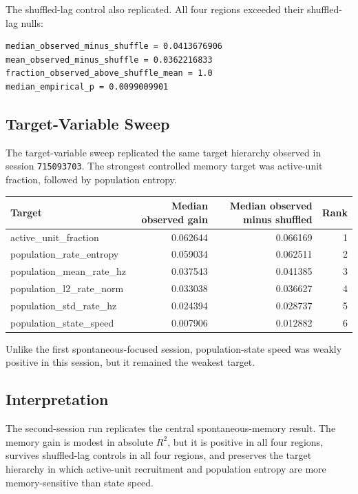 The shuffled-lag control also replicated. All four regions exceeded their shuffled-lag nulls:

\begin{verbatim}
median_observed_minus_shuffle = 0.0413676906
mean_observed_minus_shuffle = 0.0362216833
fraction_observed_above_shuffle_mean = 1.0
median_empirical_p = 0.0099009901
\end{verbatim}

\subsection{Target-Variable Sweep}

The target-variable sweep replicated the same target hierarchy observed in session \texttt{715093703}. The strongest controlled memory target was active-unit fraction, followed by population entropy.

\begin{center}
\begin{tabular}{lrrr}
\hline
Target & Median observed gain & Median observed minus shuffled & Rank \\
\hline
active\_unit\_fraction & 0.062644 & 0.066169 & 1 \\
population\_rate\_entropy & 0.059034 & 0.062511 & 2 \\
population\_mean\_rate\_hz & 0.037543 & 0.041385 & 3 \\
population\_l2\_rate\_norm & 0.033038 & 0.036627 & 4 \\
population\_std\_rate\_hz & 0.024394 & 0.028737 & 5 \\
population\_state\_speed & 0.007906 & 0.012882 & 6 \\
\hline
\end{tabular}
\end{center}

Unlike the first spontaneous-focused session, population-state speed was weakly positive in this session, but it remained the weakest target.

\subsection{Interpretation}

The second-session run replicates the central spontaneous-memory result. The memory gain is modest in absolute \(R^2\), but it is positive in all four regions, survives shuffled-lag controls in all four regions, and preserves the target hierarchy in which active-unit recruitment and population entropy are more memory-sensitive than state speed.

